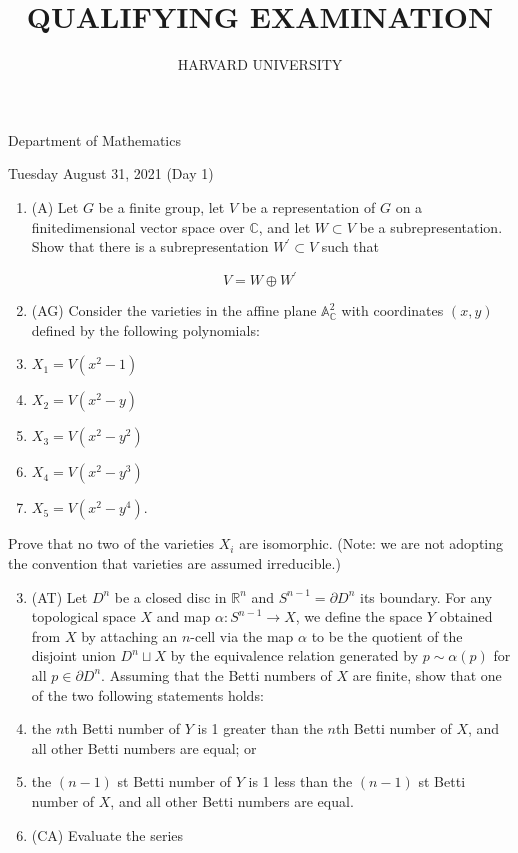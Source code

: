 \documentclass[10pt]{article}
\title{QUALIFYING EXAMINATION }
\author{HARVARD UNIVERSITY}
\date{}
\begin{document}
\maketitle
Department of Mathematics

Tuesday August 31, 2021 (Day 1)

\begin{enumerate}
  \item (A) Let $G$ be a finite group, let $V$ be a representation of $G$ on a finitedimensional vector space over $\mathbb{C}$, and let $W \subset V$ be a subrepresentation. Show that there is a subrepresentation $W^{\prime} \subset V$ such that
\end{enumerate}

$$
V=W \oplus W^{\prime}
$$

\begin{enumerate}
  \setcounter{enumi}{1}
  \item (AG) Consider the varieties in the affine plane $\mathbb{A}_{\mathbb{C}}^{2}$ with coordinates $(x, y)$ defined by the following polynomials:

  \item $X_{1}=V\left(x^{2}-1\right)$

  \item $X_{2}=V\left(x^{2}-y\right)$

  \item $X_{3}=V\left(x^{2}-y^{2}\right)$

  \item $X_{4}=V\left(x^{2}-y^{3}\right)$

  \item $X_{5}=V\left(x^{2}-y^{4}\right)$.

\end{enumerate}

Prove that no two of the varieties $X_{i}$ are isomorphic. (Note: we are not adopting the convention that varieties are assumed irreducible.)

\begin{enumerate}
  \setcounter{enumi}{2}
  \item (AT) Let $D^{n}$ be a closed disc in $\mathbb{R}^{n}$ and $S^{n-1}=\partial D^{n}$ its boundary. For any topological space $X$ and map $\alpha: S^{n-1} \rightarrow X$, we define the space $Y$ obtained from $X$ by attaching an $n$-cell via the map $\alpha$ to be the quotient of the disjoint union $D^{n} \sqcup X$ by the equivalence relation generated by $p \sim \alpha(p)$ for all $p \in \partial D^{n}$. Assuming that the Betti numbers of $X$ are finite, show that one of the two following statements holds:

  \item the $n$th Betti number of $Y$ is 1 greater than the $n$th Betti number of $X$, and all other Betti numbers are equal; or

  \item the $(n-1)$ st Betti number of $Y$ is 1 less than the $(n-1)$ st Betti number of $X$, and all other Betti numbers are equal.

  \item (CA) Evaluate the series

\end{enumerate}
\end{document}
